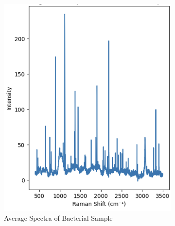 \begin{figure}[htbp]
  \centering
  \begin{subfigure}[b]{0.45\textwidth}
    \centering
    \includegraphics[width=\textwidth]{Figures/bacteria.png}
    \caption{Average Spectra of Bacterial Sample}
    \label{fig: bacteria}
  \end{subfigure}
  \hfill
  \begin{subfigure}[b]{0.45\textwidth}
    \centering

\end{subfigure}
\end{figure}
